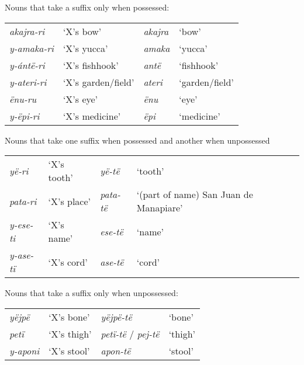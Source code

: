 \documentclass{memoir}
\begin{document}
\ex\label{onlypossessed} Nouns that take a suffix only when possessed:

\begin{tabular}[t]{llll}

 \emph{akajra-ri} &          ‘X’s bow’ & \emph{akajra} &          ‘bow’ \\

\emph{y-amaka-ri} &        ‘X’s yucca’ &  \emph{amaka} &        ‘yucca’ \\
 \emph{y-ántë-ri} &     ‘X’s fishhook’ &   \emph{antë} &     ‘fishhook’ \\
\emph{y-ateri-ri} & ‘X’s garden/field’ &  \emph{ateri} & ‘garden/field’ \\
    \emph{ënu-ru} &          ‘X’s eye’ &    \emph{ënu} &          ‘eye’ \\
  \emph{y-ëpi-ri} &     ‘X’s medicine’ &    \emph{ëpi} &     ‘medicine’ \\

\end{tabular}
 \xe

\ex\label{diffpossessed} Nouns that take one suffix when possessed and
another when unpossessed

\begin{tabular}[t]{llll}

   \emph{yë-ri} & ‘X’s tooth’ &   \emph{yë-të} &                                ‘tooth’ \\

 \emph{pata-ri} & ‘X’s place’ & \emph{pata-të} & ‘(part of name) San Juan de Manapiare’ \\
\emph{y-ese-ti} & ‘X’s name’  &  \emph{ese-të} &                                 ‘name’ \\
\emph{y-ase-tï} & ‘X’s cord’  &  \emph{ase-të} &                                 ‘cord’ \\

\end{tabular}
 \xe

\ex\label{suffunpossessed} Nouns that take a suffix only when
unpossessed:

\begin{tabular}[t]{llll}

  \emph{yëjpë} &  ‘X’s bone’ &                \emph{yëjpë-të} &  ‘bone’ \\

   \emph{petï} & ‘X’s thigh’ & \emph{petï-të} / \emph{pej-të} & ‘thigh’ \\
\emph{y-aponi} & ‘X’s stool’ &                 \emph{apon-të} & ‘stool’ \\

\end{tabular}
 \xe
\end{document}
